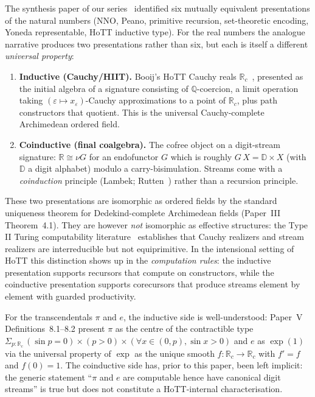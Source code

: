 \documentclass[12pt]{article}
\theoremstyle{definition}
\theoremstyle{remark}
\newcommand{\Q}{\mathbb{Q}}
\newcommand{\R}{\mathbb{R}}
\newcommand{\Rc}{\R_c}
\newcommand{\D}{\mathbb{D}}
\begin{document}
The synthesis paper of our series~\cite{synthesis} identified six
mutually equivalent presentations of the natural numbers (NNO,
Peano, primitive recursion, set-theoretic encoding, Yoneda
representable, HoTT inductive type). For the real numbers the analogue
narrative produces two presentations rather than six, but each is
itself a different \emph{universal property}:

\begin{enumerate}
    \item \textbf{Inductive (Cauchy/HIIT).} Booij's HoTT Cauchy reals
    $\Rc$~\cite{booij}, presented as the initial algebra of a signature
    consisting of $\Q$-coercion, a limit operation taking
    $(\varepsilon \mapsto x_\varepsilon)$-Cauchy approximations to a
    point of $\Rc$, plus path constructors that quotient. This is the
    universal Cauchy-complete Archimedean ordered field.
    \item \textbf{Coinductive (final coalgebra).} The cofree object on
    a digit-stream signature: $\R \cong \nu G$ for an endofunctor
    $G$ which is roughly $G\,X = \D \times X$ (with $\D$ a
    digit alphabet) modulo a carry-bisimulation. Streams come with a
    \emph{coinduction} principle (Lambek; Rutten~\cite{rutten})
    rather than a recursion principle.
\end{enumerate}

These two presentations are isomorphic as ordered fields by
the standard uniqueness theorem for Dedekind-complete Archimedean
fields (Paper~III Theorem~4.1). They are however \emph{not}
isomorphic as effective structures: the Type II Turing computability
literature~\cite{weihrauch} establishes that Cauchy realizers and
stream realizers are interreducible but not equiprimitive. In the
intensional setting of HoTT this distinction shows up in the
\emph{computation rules}: the inductive presentation supports
recursors that compute on constructors, while the coinductive
presentation supports corecursors that produce streams element by
element with guarded productivity.

For the transcendentals $\pi$ and $e$, the inductive side is
well-understood: Paper~V Definitions~8.1--8.2 present
$\pi$ as the centre of the contractible type
$\Sigma_{p:\Rc}\,(\sin p = 0)\times(p>0)\times(\forall x \in (0,p),\sin x>0)$
and $e$ as $\exp(1)$ via the universal property of $\exp$ as the
unique smooth $f:\Rc\to\Rc$ with $f'=f$ and $f(0)=1$. The
coinductive side has, prior to this paper, been left implicit: the
generic statement ``$\pi$ and $e$ are computable hence have
canonical digit streams'' is true but does not constitute a
HoTT-internal characterisation.
\end{document}
